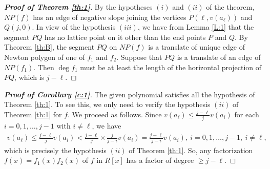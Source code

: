 \documentclass[12pt]{amsart}%
\begin{document}
\begin{proof}[\bf Proof of Theorem \ref{th:1}] By the hypotheses $(i)$ and $(ii)$ of the theorem, $NP(f)$ has an edge of negative slope joining the vertices $P(\ell,v(a_\ell))$ and $Q(j,0)$. In view of the hypothesis $(iii)$, we have from Lemma \ref{L:1} that the segment $PQ$ has no lattice point on it other than the end points $P$ and $Q$. By Theorem \ref{th:B}, the segment $PQ$ on $NP(f)$ is a translate of unique edge of Newton polygon of one of $f_1$ and $f_2$. Suppose that $PQ$ is a translate of an edge of $NP(f_1)$. Then $\deg f_1$ must be at least the length of the horizontal projection of $PQ$, which is $j-\ell$. 
\end{proof}
\begin{proof}[\bf Proof of Corollary \ref{c:1}]
The given polynomial satisfies all the hypothesis of Theorem \ref{th:1}. To see this, we only need to verify the hypothesis $(ii)$ of Theorem \ref{th:1} for $f$. We proceed as follows. Since $v(a_\ell)\leq \frac{j-\ell}{j}v(a_i)$ for each $i=0,1,\ldots, j-1$ with $i\neq \ell$, we have
\begin{eqnarray*}
v(a_\ell)\leq \frac{j-\ell}{j}v(a_i)<\frac{j-\ell}{j}\times \frac{j}{j-i}v(a_i)=\frac{j-\ell}{j-i}v(a_i),~i=0,1,\ldots, j-1,~i\neq \ell,
\end{eqnarray*}
which is precisely the hypothesis $(ii)$ of Theorem \ref{th:1}. So, any factorization $f(x)=f_1(x)f_2(x)$ of $f$ in $R[x]$ has a factor of degree $\geq j-\ell$.
\end{proof}
\end{document}
